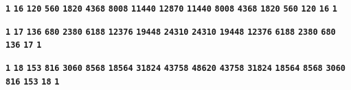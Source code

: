 \documentclass{article}
\begin{document}
\hfil
\begin{minipage}{21.250000cm}
\textbf{\texttt{\Large 1}} \hfil \textbf{\texttt{\Large 16}} \hfil \textbf{\texttt{\Large 120}} \hfil \textbf{\texttt{\Large 560}} \hfil \textbf{\texttt{\Large 1820}} \hfil \textbf{\texttt{\Large 4368}} \hfil \textbf{\texttt{\Large 8008}} \hfil \textbf{\texttt{\Large 11440}} \hfil \textbf{\texttt{\Large 12870}} \hfil \textbf{\texttt{\Large 11440}} \hfil \textbf{\texttt{\Large 8008}} \hfil \textbf{\texttt{\Large 4368}} \hfil \textbf{\texttt{\Large 1820}} \hfil \textbf{\texttt{\Large 560}} \hfil \textbf{\texttt{\Large 120}} \hfil \textbf{\texttt{\Large 16}} \hfil \textbf{\texttt{\Large 1}}
\end{minipage} 
\hfil
\par
\vfil



\hfil
\begin{minipage}{22.500000cm}
\textbf{\texttt{\Large 1}} \hfil \textbf{\texttt{\Large 17}} \hfil \textbf{\texttt{\Large 136}} \hfil \textbf{\texttt{\Large 680}} \hfil \textbf{\texttt{\Large 2380}} \hfil \textbf{\texttt{\Large 6188}} \hfil \textbf{\texttt{\Large 12376}} \hfil \textbf{\texttt{\Large 19448}} \hfil \textbf{\texttt{\Large 24310}} \hfil \textbf{\texttt{\Large 24310}} \hfil \textbf{\texttt{\Large 19448}} \hfil \textbf{\texttt{\Large 12376}} \hfil \textbf{\texttt{\Large 6188}} \hfil \textbf{\texttt{\Large 2380}} \hfil \textbf{\texttt{\Large 680}} \hfil \textbf{\texttt{\Large 136}} \hfil \textbf{\texttt{\Large 17}} \hfil \textbf{\texttt{\Large 1}}
\end{minipage} 
\hfil
\par
\vfil



\hfil
\begin{minipage}{23.750000cm}
\textbf{\texttt{\Large 1}} \hfil \textbf{\texttt{\Large 18}} \hfil \textbf{\texttt{\Large 153}} \hfil \textbf{\texttt{\Large 816}} \hfil \textbf{\texttt{\Large 3060}} \hfil \textbf{\texttt{\Large 8568}} \hfil \textbf{\texttt{\Large 18564}} \hfil \textbf{\texttt{\Large 31824}} \hfil \textbf{\texttt{\Large 43758}} \hfil \textbf{\texttt{\Large 48620}} \hfil \textbf{\texttt{\Large 43758}} \hfil \textbf{\texttt{\Large 31824}} \hfil \textbf{\texttt{\Large 18564}} \hfil \textbf{\texttt{\Large 8568}} \hfil \textbf{\texttt{\Large 3060}} \hfil \textbf{\texttt{\Large 816}} \hfil \textbf{\texttt{\Large 153}} \hfil \textbf{\texttt{\Large 18}} \hfil \textbf{\texttt{\Large 1}}
\end{minipage} 
\hfil
\par
\vfil
\end{document}
